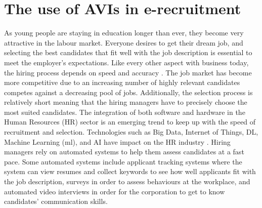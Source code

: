 \section{The use of AVIs in e-recruitment}
As young people are staying in education longer than ever, they become very attractive in the labour market. Everyone desires to get their dream job, and selecting the best candidates that fit well with the job description is essential to meet the employer's expectations. Like every other aspect with business today, the hiring process depends on speed and accuracy \cite{hiring-process-Sołek-BorowskaWilczewska+2018+25+33}. The job market has become more competitive due to an increasing number of highly relevant candidates competes against a decreasing pool of jobs. Additionally, the selection process is relatively short meaning that the hiring managers have to precisely choose the most suited candidates. The integration of both software and hardware in the Human Resources (HR) sector is an emerging trend to keep up with the speed of recruitment and selection. Technologies such as Big Data, Internet of Things, DL, Machine Learning (\acrshort{ml}), and AI have impact on the HR industry \cite{robotic-process-nawaz2019robotic}. Hiring managers rely on automated systems to help them assess candidates at a fast pace. Some automated systems include  applicant tracking systems \cite{ATS2015} where the system can view resumes and collect keywords to see how well applicants fit with the job description, surveys \cite{ONEILL2013162} in order to assess behaviours at the workplace, and automated video interviews \cite{Chen2017_video_interview} in order for the corporation to get to know candidates' communication skills. \\

